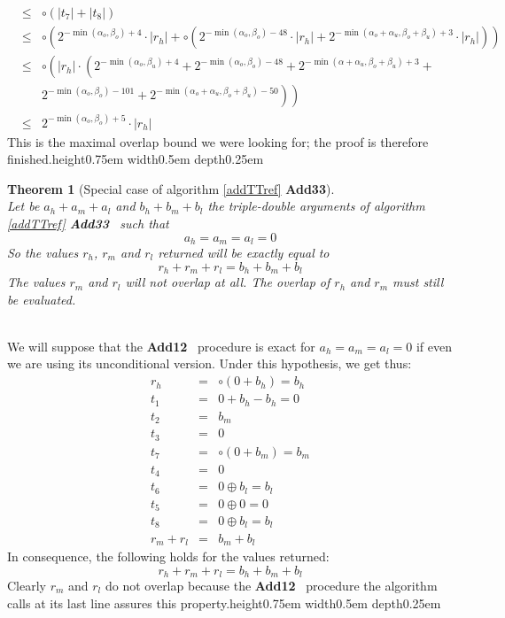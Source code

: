 \documentclass[a4paper,10pt,twoside]{article}
\newtheorem{theorem}{Theorem}[section]
\newenvironment{proof}[1][Proof]{\begin{trivlist}
\item[\hskip \labelsep {\bfseries #1}]}{\end{trivlist}}
\newcommand{\qed}{\nobreak \ifvmode \relax \else \ifdim \lastskip<1.5em \hskip-\lastskip
\hskip1.5em plus0em minus0.5em \fi \nobreak \vrule height0.75em width0.5em depth0.25em\fi}
\newcommand{\hi}{\ensuremath{\mathit{h}}}
\newcommand{\mi}{\ensuremath{\mathit{m}}}
\newcommand{\lo}{\ensuremath{\mathit{l}}}
\newcommand{\Add}{{\bf Add12}}
\newcommand{\AddTT}{{\bf Add33}}
\begin{document}
\begin{proof}
\begin{eqnarray*}
& \leq & \circ \left( \left \vert t_7 \right \vert + \left \vert t_8 \right \vert \right) \\
& \leq & \circ \left( 2^{-\min\left(\alpha_o,\beta_o\right)+4} \cdot \left \vert r_\hi \right \vert + 
\circ \left( 2^{-\min\left(\alpha_o,\beta_o\right)-48} \cdot \left \vert r_\hi \right \vert + 
2^{-\min\left(\alpha_o+\alpha_u,\beta_o+\beta_u\right)+3} \cdot \left \vert r_\hi \right \vert \right) \right) \\
& \leq & \circ \left( \left \vert r_\hi \right \vert \cdot \left( 2^{-\min\left(\alpha_o,\beta_u\right)+4} + 
2^{-\min\left(\alpha_o,\beta_o\right)-48} + 2^{-\min\left(\alpha+\alpha_u,\beta_o+\beta_u\right)+3} + \right. \right. \\
& & \left. \left. 2^{-\min\left(\alpha_o,\beta_o\right) -101} + 2^{-\min\left(\alpha_o+\alpha_u,\beta_o+\beta_u\right)-50} \right) \right) \\
& \leq & 2^{-\min\left(\alpha_o,\beta_o\right)+5} \cdot \left \vert r_\hi \right \vert
\end{eqnarray*}
This is the maximal overlap bound we were looking for; the proof is therefore finished.\qed
\end{proof}
\begin{theorem}[Special case of algorithm \ref{addTTref} \AddTT] ~ \\
Let be $a_\hi + a_\mi + a_\lo$ and $b_\hi + b_\mi + b_\lo$ the triple-double
arguments of algorithm \ref{addTTref} \AddTT~ such that 
$$a_\hi = a_\mi = a_\lo = 0$$
So the values $r_\hi$, $r_\mi$ and $r_\lo$ returned will be exactly equal to 
$$r_\hi + r_\mi + r_\lo = b_\hi + b_\mi + b_\lo$$
The values $r_\mi$ and $r_\lo$ will not overlap at all. The overlap of $r_\hi$
and $r_\mi$ must still be evaluated.
\end{theorem}
\begin{proof} ~\\
We will suppose that the \Add~ procedure is exact for $a_\hi=a_\mi=a_\lo=0$ if even we are using its unconditional 
version. Under this hypothesis, we get thus: 
\begin{eqnarray*}
r_\hi & = & \circ \left( 0 + b_\hi \right) = b_\hi \\
t_1 & = & 0 + b_\hi - b_\hi = 0 \\
t_2 & = & b_\mi \\
t_3 & = & 0 \\
t_7 & = & \circ \left( 0 + b_\mi \right) = b_\mi \\
t_4 & = & 0 \\
t_6 & = & 0 \oplus b_\lo = b_\lo \\
t_5 & = & 0 \oplus 0 = 0 \\
t_8 & = & 0 \oplus b_\lo = b_\lo \\
r_\mi + r_\lo & = & b_\mi + b_\lo 
\end{eqnarray*}
In consequence, the following holds for the values returned:
$$r_\hi + r_\mi + r_\lo = b_\hi + b_\mi + b_\lo$$
Clearly $r_\mi$ and $r_\lo$ do not overlap because the \Add~ procedure the algorithm calls at its last line assures this
property.\qed
\end{proof}
\end{document}
